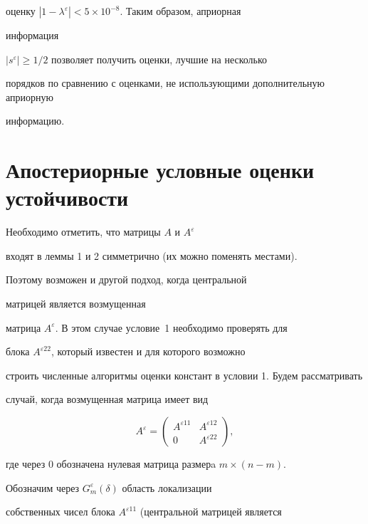 оценку $|1-\lambda^{\varepsilon}| < 5\times 10^{-8}$. Таким образом, априорная


информация


$|s^{\varepsilon}|\ge 1/2$ позволяет получить оценки, лучшие на несколько


порядков по сравнению с оценками, не использующими дополнительную априорную


информацию.





\section{Апостериорные условные оценки устойчивости}





Необходимо отметить, что матрицы $A$ и $A^{\varepsilon}$ 


входят в леммы 1 и 2 симметрично (их можно поменять местами).


Поэтому возможен и другой подход, когда центральной 


матрицей является возмущенная


матрица $A^{\varepsilon}$. В этом случае условие~1 необходимо проверять для


блока $A^{\varepsilon 22}$, который известен и для которого возможно


строить численные алгоритмы оценки констант в условии 1. Будем рассматривать


случай, когда возмущенная матрица имеет вид


\begin{equation}


A^{\varepsilon}=\begin{pmatrix}


A^{\varepsilon 11}& A^{\varepsilon 12} \\


0 & A^{\varepsilon 22}


\end{pmatrix},


\end{equation}


где через $0$ обозначена нулевая матрица размерa $m\times (n-m)$.


Обозначим через $G_m^{\varepsilon}(\delta)$ область локализации


собственных чисел блока $A^{\varepsilon 11}$ (центральной матрицей является


